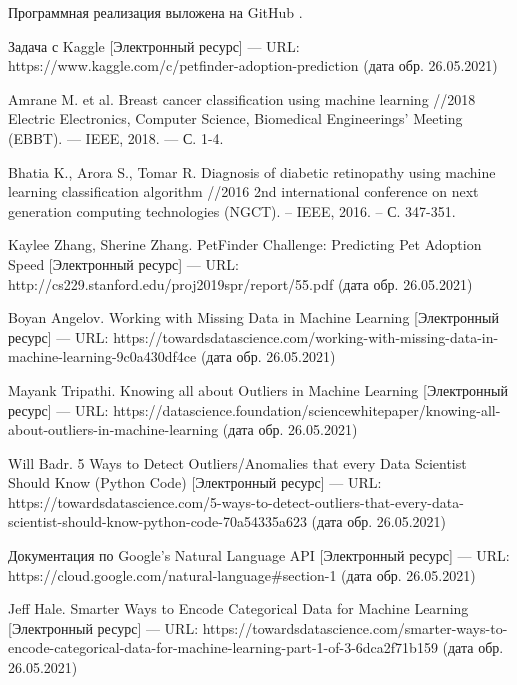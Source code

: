 \documentclass[14pt]{mmcs_article}
\begin{document}
Программная реализация выложена на GitHub \cite{lib:result}.



\newpage

\renewcommand{\refname}{\centering \textbf{Литература}}

\begin{thebibliography}{0}
Задача с Kaggle [Электронный ресурс] --- URL: https://www.kaggle.com/c/petfinder-adoption-prediction (дата обр. 26.05.2021)

Amrane M. et al. Breast cancer classification using machine learning //2018 Electric Electronics, Computer Science, Biomedical Engineerings' Meeting (EBBT). --- IEEE, 2018. --- С. 1-4.

Bhatia K., Arora S., Tomar R. Diagnosis of diabetic retinopathy using machine learning classification algorithm //2016 2nd international conference on next generation computing technologies (NGCT). – IEEE, 2016. – С. 347-351.

Kaylee Zhang, Sherine Zhang. PetFinder Challenge: Predicting Pet Adoption Speed [Электронный ресурс] --- URL: http://cs229.stanford.edu/proj2019spr/report/55.pdf (дата обр. 26.05.2021)

Boyan Angelov. Working with Missing Data in Machine Learning  [Электронный ресурс] --- URL:  https://towardsdatascience.com/working-with-missing-data-in-machine-learning-9c0a430df4ce (дата обр. 26.05.2021)

Mayank Tripathi. Knowing all about Outliers in Machine Learning  [Электронный ресурс] --- URL:  https://datascience.foundation/sciencewhitepaper/knowing-all-about-outliers-in-machine-learning (дата обр. 26.05.2021)

Will Badr. 5 Ways to Detect Outliers/Anomalies that every Data Scientist Should Know (Python Code) [Электронный ресурс] --- URL: https://towardsdatascience.com/5-ways-to-detect-outliers-that-every-data-scientist-should-know-python-code-70a54335a623 (дата обр. 26.05.2021)

Документация по Google’s Natural Language API [Электронный ресурс] --- URL:  https://cloud.google.com/natural-language\#section-1 (дата обр. 26.05.2021)

Jeff Hale. Smarter Ways to Encode Categorical Data for Machine Learning  [Электронный ресурс] --- URL:  https://towardsdatascience.com/smarter-ways-to-encode-categorical-data-for-machine-learning-part-1-of-3-6dca2f71b159 (дата обр. 26.05.2021)


\end{thebibliography}
\end{document}
